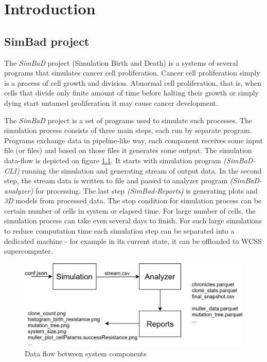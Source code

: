 \chapter{Introduction}
\label{chapter:1}
\section{SimBad project}
The \textit{SimBaD} project (Simulation Birth and Death) is a systems of several programs that simulates cancer cell proliferation. Cancer cell proliferation simply is a process of cell growth and division. Abnormal cell proliferation, that is, when  cells that divide only finite amount of time before halting their growth or simply dying start untamed proliferation it may cause cancer development.

The \textit{SimBaD} project is a set of programs used to simulate such processes. The simulation process consists of three main steps, each run by separate program. Programs exchange data in pipeline-like way, each component receives some input file (or files) and based on those files it generates some output. The simulation data-flow is depicted on figure \ref{fig:data-flow}. It starts with simulation program \textit{(SimBaD-CLI)} running the simulation and generating stream of output data. In the second step, the stream data is written to file and passed to analyzer program \textit{(SimBaD-analyzer)} for processing. The last step \textit{(SimBad-Reports)} is generating plots and \textit{3D} models from processed data.
The stop condition for simulation process can be certain number of cells in system or elapsed time. For large number of cells, the simulation process can take even several days to finish. For such large simulations to reduce computation time each simulation step can be separated into a dedicated machine - for example in its current state, it can be offloaded to WCSS supercomputer. 
\begin{figure}[h!]
	\centering
		\includegraphics[width=0.9\linewidth]{diagrams/simbad-data-flow.png}
	\caption{Data flow between system components}
	\label{fig:data-flow}
\end{figure}
